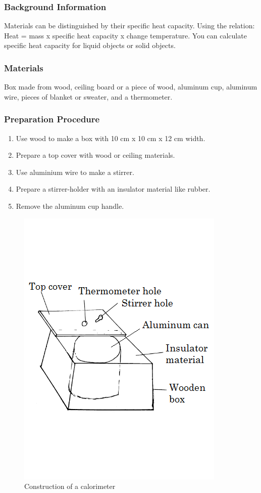 \subsubsection*{Background Information}
Materials can be distinguished by their specific heat capacity. Using the relation: Heat = mass x specific heat capacity x change temperature. You can calculate specific heat capacity for liquid objects or solid objects.

\subsubsection*{Materials}
Box made from wood, ceiling board or a piece of wood, aluminum cup, aluminum wire, pieces of blanket or sweater, and a thermometer.

\subsubsection*{Preparation Procedure}
\begin{enumerate}
\item{Use wood to make a box with 10 cm x 10 cm x 12 cm width.}
\item{Prepare a top cover with wood or ceiling materials.}
\item{Use aluminium wire to make a stirrer.}
\item{Prepare a stirrer-holder with an insulator material like rubber.}
\item{Remove the aluminum cup handle.}
\end{enumerate}

\begin{figure}
\begin{center}
\includegraphics{./img/calorimeter.png}
\caption{Construction of a calorimeter}
\label{fig:calorimeter}
\end{center}
\end{figure}

